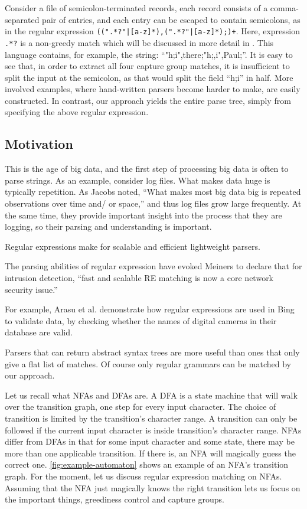 \documentclass[english]{sigplanconf}
\theoremstyle{definition}
\newcommand{\ins}[1]{\textcolor{blue}{\uline{#1}}} %
\newcommand{\ins}[1]{#1} %
\renewcommand{\ins}[1]{#1} %
\newcommand\ml[1]{\nbc{ML}{#1}{violet}} %
\begin{document}
Consider a file of semicolon-terminated records, each record consists
of a comma-separated pair of entries, and each entry can be escaped
to contain semicolons, as in the regular expression
\texttt{((".*?"|[a-z]*),(".*?"|[a-z]*);)+}. Here, expression
\texttt{.*?} is a non-greedy match which will be discussed in more
detail in .  This language contains, for example, the
string: ``"h;i",there;"h;,i",Paul;''.  It is easy to see that, in
order to extract all four capture group matches, it is insufficient
to split the input at the semicolon, as that would split the field
``h;i'' in half.  More involved examples, where hand-written parsers
become harder to make, are easily constructed.  In contrast, our
approach yields the entire parse tree, simply from specifying the
above regular expression.


\subsection{Motivation}

This is the age of big data, and the first step of processing big
data is often to parse strings. As an example, consider log files.
What makes data huge is typically repetition. As Jacobs\cite{Jaco09a}
noted, ``What makes most big data big is repeated observations over
time and/ or space,'' and thus log files grow large frequently. At
the same time, they provide important insight into the process that
they are logging, so their parsing and understanding is important. 

Regular expressions make for scalable and efficient lightweight parsers.\cite{Kart96a} 

The parsing abilities of regular expression have evoked Meiners to declare
that for intrusion detection, ``fast and scalable RE matching is
now a core network security issue.'' \cite{Mein10a}

For example, Arasu et al. \cite{Aras12a} demonstrate how regular
expressions are used in Bing to validate data, by checking whether
the names of digital cameras in their database are valid.

Parsers that can return abstract syntax trees are more useful than
ones that only give a flat list of matches. Of course only regular
grammars can be matched by our approach.

\ml{This next paragraph falls out of the sky a bit :)}
Let us recall what NFAs and DFAs are. A DFA is a state machine that
will walk over the transition graph, one step for every input
character. The choice of transition is limited by the transition's
character range. A transition can only be followed if the current
input character is inside transition's character range. NFAs differ
from DFAs in that for some input character and some state, there may
be more than \ins{one} applicable transition. If there is, an NFA will magically
guess the correct one. \autoref{fig:example-automaton} shows an example of
an NFA's transition graph. For the moment, let us discuss regular
expression matching on NFAs. Assuming that the NFA just magically knows
the right transition lets us focus on the important things, greediness control
and capture groups.
\end{document}
